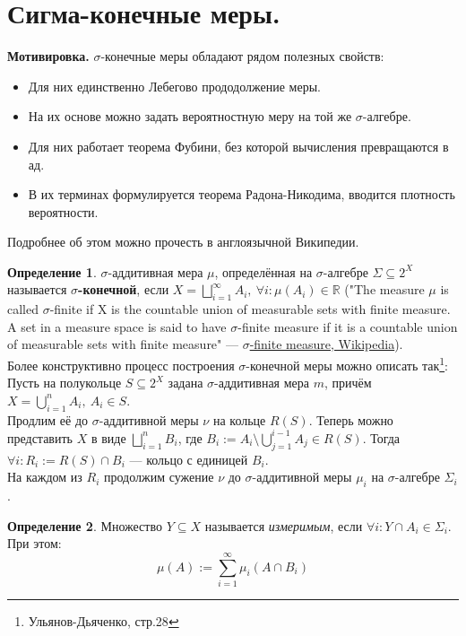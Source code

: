 \documentclass[11pt,a4paper]{report}
\def\Real{\mathbb{R}}
\theoremstyle{definition}
\theoremstyle{definition}
\theoremstyle{definition}
\newtheorem{definition}{Определение}[section]
\begin{document}
	\section{Сигма-конечные меры.}
	\textbf{Мотивировка.} $ \sigma $-конечные меры обладают рядом полезных свойств:
	\begin{itemize}
		\item Для них единственно Лебегово прододолжение меры.
		\item На их основе можно задать вероятностную меру на той же $ \sigma $-алгебре.
		\item Для них работает теорема Фубини, без которой вычисления превращаются в ад.
		\item В их терминах формулируется теорема Радона-Никодима, вводится плотность вероятности.
	\end{itemize}
	Подробнее об этом можно прочесть в англоязычной Википедии.
	\begin{definition}
		$ \sigma $-аддитивная мера $ \mu $, определённая на $ \sigma $-алгебре $ \Sigma \subseteq 2^{X} $ называется \textbf{$ \sigma $-конечной}, если $ X = \bigsqcup_{i=1}^{\infty}{A_{i}},\ \forall i: \mu(A_{i}) \in \Real $ ("The measure $ \mu $ is called $ \sigma $-finite if X is the countable union of measurable sets with finite measure. A set in a measure space is said to have $ \sigma $-finite measure if it is a countable union of measurable sets with finite measure" — \href{https://en.wikipedia.org/wiki/%CE%A3-finite_measure}{$ \sigma $-finite measure, Wikipedia}).\\
		Более конструктивно процесс построения $ \sigma $-конечной меры можно описать так\footnote{Ульянов-Дьяченко, стр.28}:\\
		Пусть на полукольце $ S \subseteq 2^{X} $ задана $ \sigma $-аддитивная мера $ m $, причём $ X = \bigcup\limits_{i=1}^{n}{A_{i}},\ A_{i} \in S $.\\
		Продлим её до $ \sigma $-аддитивной меры $ \nu $ на кольце $ R(S) $. Теперь можно представить $ X $ в виде $ \bigsqcup_{i=1}^{n}{B_{i}} $, где $ B_{i} := A_{i} \setminus \bigcup_{j=1}^{i-1}{A_{j}} \in R(S) $. Тогда $ \forall i: R_{i} := R(S) \cap B_{i} $ — кольцо с единицей $ B_{i} $.\\
		На каждом из $ R_{i} $ продолжим сужение $ \nu $ до $ \sigma $-аддитивной меры $ \mu_{i} $ на $ \sigma $-алгебре $ \Sigma_{i} $.
	\end{definition}
	\begin{definition}
		Множество $ Y \subseteq X $ называется \textit{измеримым}, если $ \forall i: Y \cap A_{i} \in \Sigma_{i} $.\\
		При этом: \[ \mu(A) := \sum_{i=1}^{\infty}{\mu_{i}(A \cap B_{i})} \]
	\end{definition}
\end{document}
